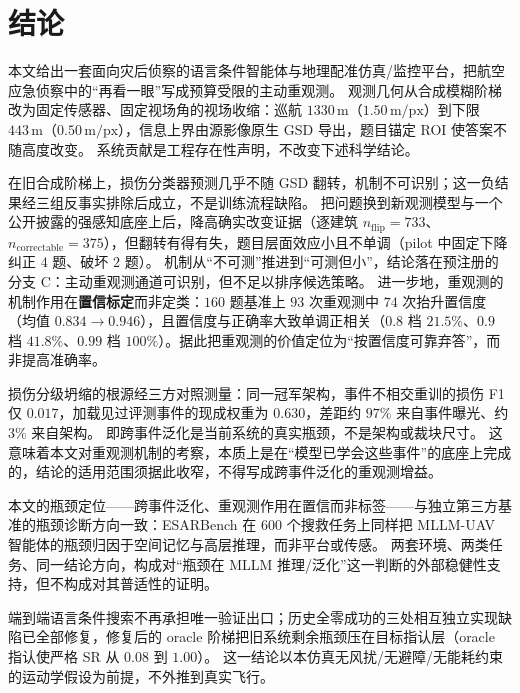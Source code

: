 \section{结论}
\label{sec:conclusion}

本文给出一套面向灾后侦察的语言条件智能体与地理配准仿真/监控平台，把航空应急侦察中的``再看一眼''写成预算受限的主动重观测。
观测几何从合成模糊阶梯改为固定传感器、固定视场角的视场收缩：巡航 $1330\,\mathrm{m}$（$1.50\,\mathrm{m/px}$）到下限 $443\,\mathrm{m}$（$0.50\,\mathrm{m/px}$），信息上界由源影像原生 GSD 导出，题目锚定 ROI 使答案不随高度改变。
系统贡献是工程存在性声明，不改变下述科学结论。


在旧合成阶梯上，损伤分类器预测几乎不随 GSD 翻转，机制不可识别；这一负结果经三组反事实排除后成立，不是训练流程缺陷。
把问题换到新观测模型与一个公开披露的强感知底座上后，降高确实改变证据（逐建筑 $n_{\mathrm{flip}}=733$、$n_{\mathrm{correctable}}=375$），但翻转有得有失，题目层面效应小且不单调（pilot 中固定下降纠正 $4$ 题、破坏 $2$ 题）。
机制从``不可测''推进到``可测但小''，结论落在预注册的分支 C：主动重观测通道可识别，但不足以排序候选策略。
进一步地，重观测的机制作用在\textbf{置信标定}而非定类：$160$ 题基准上 $93$ 次重观测中 $74$ 次抬升置信度（均值 $0.834\to0.946$），且置信度与正确率大致单调正相关（$0.8$ 档 $21.5\%$、$0.9$ 档 $41.8\%$、$0.99$ 档 $100\%$）。据此把重观测的价值定位为``按置信度可靠弃答''，而非提高准确率。

损伤分级坍缩的根源经三方对照测量：同一冠军架构，事件不相交重训的损伤 F1 仅 $0.017$，加载见过评测事件的现成权重为 $0.630$，差距约 $97\%$ 来自事件曝光、约 $3\%$ 来自架构。
即跨事件泛化是当前系统的真实瓶颈，不是架构或裁块尺寸。
这意味着本文对重观测机制的考察，本质上是在``模型已学会这些事件''的底座上完成的，结论的适用范围须据此收窄，不得写成跨事件泛化的重观测增益。

本文的瓶颈定位——跨事件泛化、重观测作用在置信而非标签——与独立第三方基准的瓶颈诊断方向一致：ESARBench 在 600 个搜救任务上同样把 MLLM-UAV 智能体的瓶颈归因于空间记忆与高层推理，而非平台或传感\cite{zhang2026esarbench}。
两套环境、两类任务、同一结论方向，构成对``瓶颈在 MLLM 推理/泛化''这一判断的外部稳健性支持，但不构成对其普适性的证明。

端到端语言条件搜索不再承担唯一验证出口；历史全零成功的三处相互独立实现缺陷已全部修复，修复后的 oracle 阶梯把旧系统剩余瓶颈压在目标指认层（oracle 指认使严格 SR 从 $0.08$ 到 $1.00$）。
这一结论以本仿真无风扰/无避障/无能耗约束的运动学假设为前提，不外推到真实飞行。
